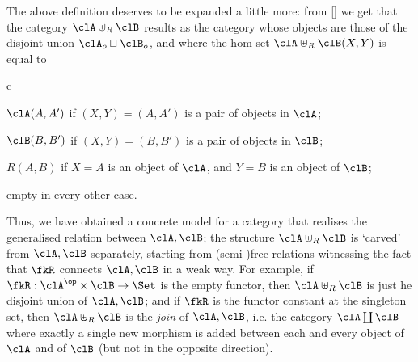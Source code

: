 \begin{remark}
	The above definition deserves to be expanded a little more: from \autoref{} we get that the category $\clA\uplus_R\clB$ results as the category whose objects are those of the disjoint union $\clA_o\sqcup\clB_o$, and where the hom-set $\clA\uplus_R\clB(X,Y)$ is equal to
	\begin{enumtag}{c}
		\item $\clA(A,A')$ if $(X,Y)=(A,A')$ is a pair of objects in $\clA$;
		\item $\clB(B,B')$ if $(X,Y)=(B,B')$ is a pair of objects in $\clB$;
		\item $R(A,B)$ if $X=A$ is an object of $\clA$, and $Y=B$ is an object of $\clB$;
		\item empty in every other case.
	\end{enumtag}
\end{remark}
Thus, we have obtained a concrete model for a category that realises the generalised relation between $\clA,\clB$; the structure $\clA\uplus_R\clB$ is `carved' from $\clA,\clB$ separately, starting from (semi-)free relations witnessing the fact that $\fkR$ connects $\clA,\clB$ in a weak way. For example, if $\fkR : \clA^\op\times \clB \to \Set$ is the empty functor, then $\clA\uplus_R\clB$ is just he disjoint union of $\clA,\clB$; and if $\fkR$ is the functor constant at the singleton set, then $\clA\uplus_R\clB$ is the \emph{join} of $\clA,\clB$, i.e. the category $\clA\coprod\clB$ where exactly a single new morphism is added between each and every object of $\clA$ and of $\clB$ (but not in the opposite direction).